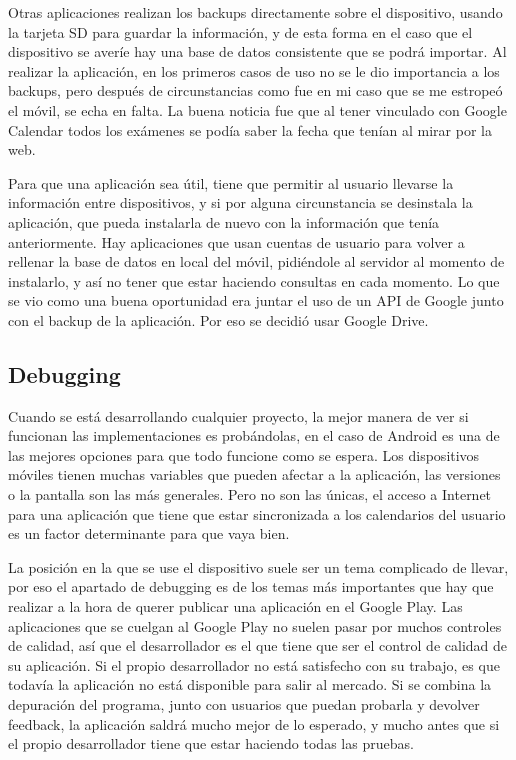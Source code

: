 Otras aplicaciones realizan los backups directamente sobre el dispositivo, usando la tarjeta SD para guardar la información, y de esta forma en el caso que el dispositivo se averíe hay una base de datos consistente que se podrá importar.
Al realizar la aplicación, en los primeros casos de uso no se le dio importancia a los backups, pero después de circunstancias como fue en mi caso que se me estropeó el móvil, se echa en falta. La buena noticia fue que al tener vinculado con Google Calendar todos los exámenes se podía saber la fecha que tenían al mirar por la web.

Para que una aplicación sea útil, tiene que permitir al usuario llevarse la información entre dispositivos, y si por alguna circunstancia se desinstala la aplicación, que pueda instalarla de nuevo con la información que tenía anteriormente.
Hay aplicaciones que usan cuentas de usuario para volver a rellenar la base de datos en local del móvil, pidiéndole al servidor al momento de instalarlo, y así no tener que estar haciendo consultas en cada momento.
Lo que se vio como una buena oportunidad era juntar el uso de un API de Google junto con el backup de la aplicación. Por eso se decidió usar Google Drive.

\subsection{Debugging}
\label{subsecc:Debugging}

Cuando se está desarrollando cualquier proyecto, la mejor manera de ver si funcionan las implementaciones es probándolas, en el caso de Android es una de las mejores opciones para que todo funcione como se espera.
Los dispositivos móviles tienen muchas variables que pueden afectar a la aplicación, las versiones o la pantalla son las más generales. Pero no son las únicas, el acceso a Internet para una aplicación que tiene que estar sincronizada a los calendarios del usuario es un factor determinante para que vaya bien.

La posición en la que se use el dispositivo suele ser un tema complicado de llevar, por eso el apartado de debugging es de los temas más importantes que hay que realizar a la hora de querer publicar una aplicación en el Google Play.
Las aplicaciones que se cuelgan al Google Play no suelen pasar por muchos controles de calidad, así que el desarrollador es el que tiene que ser el control de calidad de su aplicación. Si el propio desarrollador no está satisfecho con su trabajo, es que todavía la aplicación no está disponible para salir al mercado.
Si se combina la depuración del programa, junto con usuarios que puedan probarla y devolver feedback, la aplicación saldrá mucho mejor de lo esperado, y mucho antes que si el propio desarrollador tiene que estar haciendo todas las pruebas.

